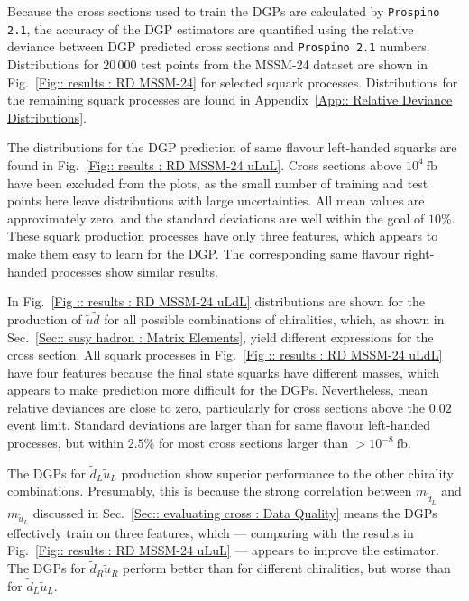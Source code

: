 \documentclass[twoside,english]{uiofysmaster}
\begin{document}
{{Because the cross sections used to train the DGPs are calculated by \verb|Prospino 2.1|, the accuracy of the DGP estimators are quantified using the relative deviance between DGP predicted cross sections and \verb|Prospino 2.1| numbers. Distributions for $20\,000$ test points from the MSSM-24 dataset are shown in Fig.~\ref{Fig:: results : RD MSSM-24} for selected squark processes. Distributions for the remaining squark processes are found in Appendix~\ref{App:: Relative Deviance Distributions}.

The distributions for the DGP prediction of same flavour left-handed squarks are found in Fig.~\ref{Fig:: results : RD MSSM-24 uLuL}. Cross sections above $10^4~\mathrm{fb}$ have been excluded from the plots, as the small number of training and test points here leave distributions with large uncertainties. All mean values are approximately zero, and the standard deviations are well within the goal of $10 \%$. These squark production processes have only three features, which appears to make them easy to learn for the DGP. The corresponding same flavour right-handed processes show similar results.

In Fig.~\ref{Fig :: results : RD MSSM-24 uLdL} distributions are shown for the production of $\widetilde{u} \widetilde{d}$ for all possible combinations of chiralities, which, as shown in Sec.~\ref{Sec:: susy hadron : Matrix Elements}, yield different expressions for the cross section. All squark processes in Fig.~\ref{Fig :: results : RD MSSM-24 uLdL} have four features because the final state squarks have different masses, which appears to make prediction more difficult for the DGPs. Nevertheless, mean relative deviances are close to zero, particularly for cross sections above the $0.02$ event limit. Standard deviations are larger than for same flavour left-handed processes, but within $2.5\%$ for most cross sections larger than $> 10^{-8}~\mathrm{fb}$.



The DGPs for $\widetilde{d}_L \widetilde{u}_L$ production show superior performance to the other chirality combinations. Presumably, this is because the strong correlation between $m_{\widetilde{d}_L}$ and $m_{\widetilde{u}_L}$ discussed in Sec.~\ref{Sec:: evaluating cross : Data Quality} means the DGPs effectively train on three features, which --- comparing with the results in Fig.~\ref{Fig:: results : RD MSSM-24 uLuL} --- appears to improve the estimator. The DGPs for $\widetilde{d}_R \widetilde{u}_R$ perform better than for different chiralities, but worse than for $\widetilde{d}_L\widetilde{u}_L$.

}}
\end{document}
